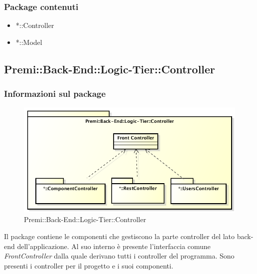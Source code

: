 	\subsubsection{Package contenuti}
	\begin{itemize}
		\item *::Controller
		\item *::Model
	\end{itemize}


\subsection{Premi::Back-End::Logic-Tier::Controller}
	\subsubsection{Informazioni sul package}
	\begin{figure}[h]
		\centering
		\includegraphics[width=0.7\linewidth]{img/back-end-package_controller}
		\caption[Premi::Back-End::Logic-Tier::Controller]{Premi::Back-End::Logic-Tier::Controller}
	\end{figure}
	Il package contiene le componenti che gestiscono la parte controller del lato back-end dell'applicazione. Al suo interno è presente l'interfaccia comune \textit{FrontController} dalla quale derivano tutti i controller del programma.
	Sono presenti i controller per il progetto e i suoi componenti.

